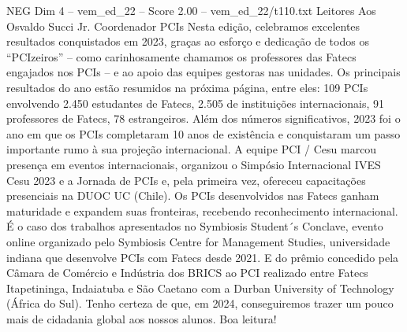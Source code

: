 \begin{textsample}{NEG Dim 4 – vem\_ed\_22 – Score 2.00 – vem\_ed\_22/t110.txt}  \label{ex:f4_neg_017}
Leitores Aos Osvaldo Succi Jr.
Coordenador PCIs Nesta edição, celebramos excelentes resultados conquistados em 2023, graças ao esforço e dedicação de todos os “PCIzeiros” – como carinhosamente chamamos os professores das Fatecs engajados nos PCIs – e ao apoio das equipes gestoras nas unidades.
Os principais resultados do ano estão resumidos na próxima página, entre eles: 109 PCIs envolvendo 2.450 estudantes de Fatecs, 2.505 de instituições internacionais, 91 professores de Fatecs, 78 estrangeiros.
Além dos números significativos, 2023 foi o ano em que os PCIs completaram 10 anos de existência e conquistaram um passo importante rumo à sua projeção internacional.
A equipe PCI / Cesu marcou presença em eventos internacionais, organizou o Simpósio Internacional IVES Cesu 2023 e a Jornada de PCIs e, pela primeira vez, ofereceu capacitações presenciais na DUOC UC (Chile).
Os PCIs desenvolvidos nas Fatecs ganham maturidade e expandem suas fronteiras, recebendo reconhecimento internacional.
É o caso dos trabalhos apresentados no Symbiosis Student´s Conclave, evento online organizado pelo Symbiosis Centre for Management Studies, universidade indiana que desenvolve PCIs com Fatecs desde 2021.
E do prêmio concedido pela Câmara de Comércio e Indústria dos BRICS ao PCI realizado entre Fatecs Itapetininga, Indaiatuba e São Caetano com a Durban University of Technology (África do Sul).
Tenho certeza de que, em 2024, conseguiremos trazer um pouco mais de cidadania global aos nossos alunos.
Boa leitura!

\end{textsample}
